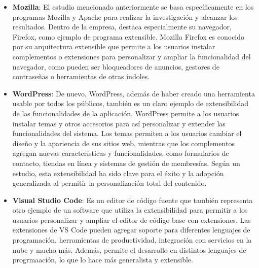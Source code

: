 \begin{itemize}
	
	\item \textbf{Mozilla}: El estudio mencionado anteriormente  \citep{mockus2002two} se basa específicamente en los programas Mozilla y Apache para realizar la investigación y alcanzar los resultados. Dentro de la empresa, destaca especialmente su navegador, Firefox, como ejemplo de programa extensible. Mozilla Firefox es conocido por su arquitectura extensible que permite a los usuarios instalar complementos o extensiones para personalizar y ampliar la funcionalidad del navegador, como pueden ser bloqueadores de anuncios, gestores de contraseñas o herramientas de otras índoles.
	
	\item \textbf{WordPress}: De nuevo, WordPress, además de haber creado una herramienta usable por todos los públicos, también es un claro ejemplo de extensibilidad de las funcionalidades de la aplicación. WordPress permite a los usuarios instalar temas y otros accesorios para así personalizar y extender las funcionalidades del sistema. Los temas permiten a los usuarios cambiar el diseño y la apariencia de sus sitios web, mientras que los complementos agregan nuevas características y funcionalidades, como formularios de contacto, tiendas en línea y sistemas de gestión de membresías. Según un estudio, esta extensibilidad ha sido clave para el éxito y la adopción generalizada al permitir la personalización total del contenido.
	
	\item \textbf{Visual Studio Code}: Es un editor de código fuente que también representa otro ejemplo de un software que utiliza la extensibilidad para permitir a los usuarios personalizar y ampliar el editor de código base con extensiones. Las extensiones de VS Code pueden agregar soporte para diferentes lenguajes de programación, herramientas de productividad, integración con servicios en la nube y mucho más. Además, permite el desarrollo en distintos lenguajes de progrmaación, lo que lo hace más generalista y extensible.
	
	
\end{itemize}
